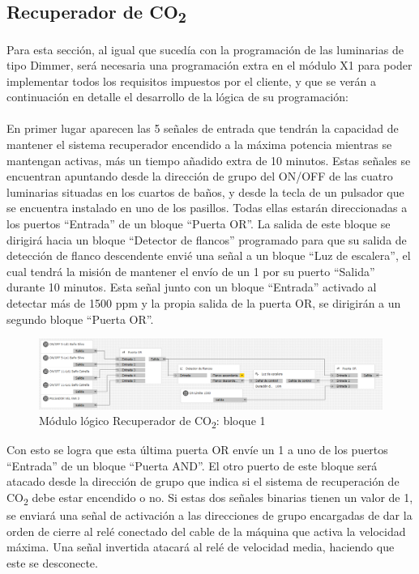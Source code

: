 \subsection{Recuperador de CO\textsubscript{2}}
Para esta sección, al igual que sucedía con la programación de las luminarias de tipo Dimmer, será necesaria una programación extra en el módulo X1 para poder implementar todos los requisitos impuestos por el cliente, y que se verán a continuación en detalle el desarrollo de la lógica de su programación:\\\\
En primer lugar aparecen las 5 señales de entrada que tendrán la capacidad de mantener el sistema recuperador encendido a la máxima potencia mientras se mantengan activas, más un tiempo añadido extra de 10 minutos. Estas señales se encuentran apuntando desde la dirección de grupo del ON/OFF de las cuatro luminarias situadas en los cuartos de baños, y desde la tecla de un pulsador que se encuentra instalado en uno de los pasillos. Todas ellas estarán direccionadas a los puertos “Entrada” de un bloque “Puerta OR”. La salida de este bloque se dirigirá hacia un bloque “Detector de flancos” programado para que su salida de detección de flanco descendente envié una señal a un bloque “Luz de escalera”, el cual tendrá la misión de mantener el envío de un 1 por su puerto “Salida” durante 10 minutos. Esta señal junto con un bloque “Entrada” activado al detectar más de 1500 ppm y la propia salida de la puerta OR, se dirigirán a un segundo bloque “Puerta OR”.
\begin{figure}[H]
\centering
\includegraphics[width=1.15\textwidth]{figures/log_co2_b1.png}   
\caption{Módulo lógico Recuperador de CO\textsubscript{2}: bloque 1}
\label{fig:log_co2_b1}
\end{figure}
Con esto se logra que esta última puerta OR envíe un 1 a uno de los puertos “Entrada” de un bloque “Puerta AND”. El otro puerto de este bloque será atacado desde la dirección de grupo que indica si el sistema de recuperación de CO\textsubscript{2} debe estar encendido o no. Si estas dos señales binarias tienen un valor de 1, se enviará una señal de activación a las direcciones de grupo encargadas de dar la orden de cierre al relé conectado del cable de la máquina que activa la velocidad máxima. Una señal invertida atacará al relé de velocidad media, haciendo que este se desconecte.
